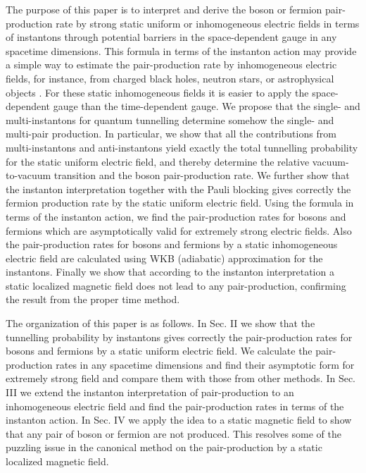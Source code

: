 \documentclass[a4paper,prd,showpacs,preprintnumbers,amsmath,amssymb]{revtex4}
\begin{document}
The purpose of this paper is to interpret and derive the boson or
fermion pair-production rate by strong static uniform or
inhomogeneous electric fields in terms of instantons through
potential barriers in the space-dependent gauge in any spacetime
dimensions. This formula in terms of the instanton action may
provide a simple way to estimate the pair-production rate by
inhomogeneous electric fields, for instance, from charged black
holes, neutron stars, or astrophysical objects \cite{ruf,ruf2}.
For these static inhomogeneous fields it is easier to apply the
space-dependent gauge than the time-dependent gauge. We propose
that the single- and multi-instantons for quantum tunnelling
determine somehow the single- and multi-pair production. In
particular, we show that all the contributions from
multi-instantons and anti-instantons yield exactly the total
tunnelling probability for the static uniform electric field, and
thereby determine the relative vacuum-to-vacuum transition and the
boson pair-production rate. We further show that the instanton
interpretation together with the Pauli blocking gives correctly
the fermion production rate by the static uniform electric field.
Using the formula in terms of the instanton action, we find the
pair-production rates for bosons and fermions which are
asymptotically valid for extremely strong electric fields. Also
the pair-production rates for bosons and fermions by a static
inhomogeneous electric field are calculated using WKB (adiabatic)
approximation for the instantons. Finally we show that according
to the instanton interpretation a static localized magnetic field
does not lead to any pair-production, confirming the result from
the proper time method.





The organization of this paper is as follows. In Sec. II we show
that the tunnelling probability by instantons gives correctly the
pair-production rates for bosons and fermions by a static uniform
electric field. We calculate the pair-production rates in any
spacetime dimensions and find their asymptotic form for extremely
strong field and compare them with those from other methods. In
Sec. III we extend the instanton interpretation of pair-production
to an inhomogeneous electric field and find the pair-production
rates in terms of the instanton action. In Sec. IV we apply the
idea to a static magnetic field to show that any pair of boson or
fermion are not produced. This resolves some of the puzzling issue
in the canonical method on the pair-production by a static
localized magnetic field.
\end{document}
